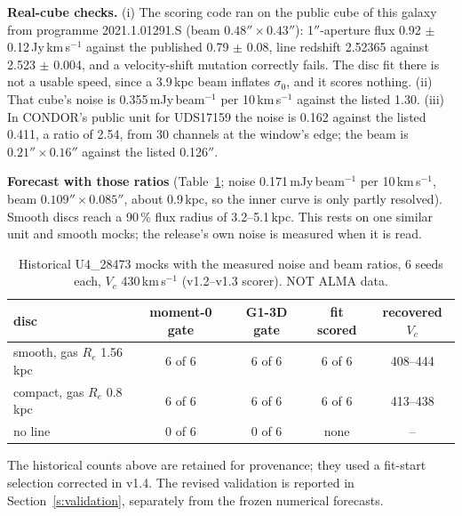 \documentclass[10pt]{article}
\begin{document}
\textbf{Real-cube checks.} (i) The scoring code ran on the public cube of this galaxy from programme 2021.1.01291.S (beam $0.48''\times0.43''$): 1$''$-aperture flux 0.92 $\pm$ 0.12\,Jy\,km\,s$^{-1}$ against the published 0.79 $\pm$ 0.08, line redshift 2.52365 against 2.523 $\pm$ 0.004, and a velocity-shift mutation correctly fails. The disc fit there is not a usable speed, since a 3.9\,kpc beam inflates $\sigma_0$, and it scores nothing. (ii) That cube's noise is 0.355\,mJy\,beam$^{-1}$ per 10\,km\,s$^{-1}$ against the listed 1.30. (iii) In CONDOR's public unit for UDS17159 the noise is 0.162 against the listed 0.411, a ratio of 2.54, from 30 channels at the window's edge; the beam is $0.21''\times0.16''$ against the listed 0.126$''$.

\textbf{Forecast with those ratios} (Table~\ref{t:mock2}; noise 0.171\,mJy\,beam$^{-1}$ per 10\,km\,s$^{-1}$, beam $0.109''\times0.085''$, about 0.9\,kpc, so the inner curve is only partly resolved). Smooth discs reach a 90\,\% flux radius of 3.2--5.1\,kpc. This rests on one similar unit and smooth mocks; the release's own noise is measured when it is read.

\begin{table}[h]\centering\small\caption{Historical U4\_28473 mocks with the measured noise and beam ratios, 6 seeds each, $V_c$ 430\,km\,s$^{-1}$ (v1.2--v1.3 scorer). NOT ALMA data.}\label{t:mock2}\begin{tabular}{lcccc}\toprule disc & moment-0 gate & G1-3D gate & fit scored & recovered $V_c$ \\ \midrule smooth, gas $R_e$ 1.56\,kpc & 6 of 6 & 6 of 6 & 6 of 6 & 408--444 \\ compact, gas $R_e$ 0.8\,kpc & 6 of 6 & 6 of 6 & 6 of 6 & 413--438 \\ no line & 0 of 6 & 0 of 6 & none & -- \\ \bottomrule\end{tabular}\end{table}

The historical counts above are retained for provenance; they used a fit-start selection corrected in v1.4. The revised validation is reported in Section~\ref{s:validation}, separately from the frozen numerical forecasts.
\end{document}
